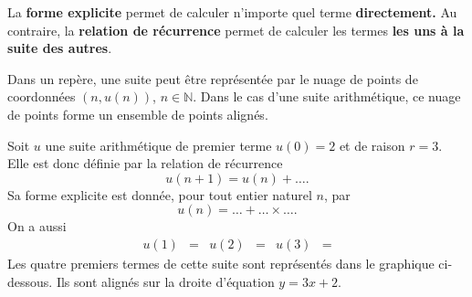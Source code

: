 \documentclass[11pt]{article}
\begin{document}
\begin{rmq}
  La \textbf{forme explicite} permet de calculer n'importe quel terme
  \textbf{directement.} Au contraire, la \textbf{relation de récurrence} permet
  de calculer les termes \textbf{les uns à la suite des autres}.
\end{rmq}

\begin{prop}
  Dans un repère, une suite peut être représentée par le nuage de points de
  coordonnées $(n, u(n))$, $n\in\mathbb{N}$. Dans le cas d'une suite
  arithmétique, ce nuage de points forme un ensemble de points alignés.
\end{prop}

\begin{exemple}
  Soit $u$ une suite arithmétique de premier terme $u(0)=2$ et de raison $r=3$.
  Elle est donc définie par la relation de récurrence
  \[
    u(n+1) = u(n) + \ldots.
  \]
  Sa forme explicite est donnée, pour tout entier naturel $n$, par
  \[
    u(n) = \ldots +\ldots\times\ldots.
  \]
  On a aussi
  \begin{align*}
    u(1) &= &
    u(2) &= &
    u(3) &=
  \end{align*}
  Les quatre premiers termes de cette suite sont représentés dans le graphique
  ci-dessous. Ils sont alignés sur la droite d'équation $y=3x+2$.
  \begin{center}
  \end{center}
\end{exemple}
\end{document}
